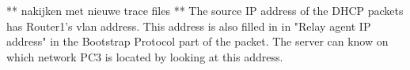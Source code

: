 ** nakijken met nieuwe trace files **
The source IP address of the DHCP packets has Router1's vlan address. This address is also filled in in "Relay agent IP address" in the Bootstrap Protocol part of the packet. The server can know on which network PC3 is located by looking at this address.
